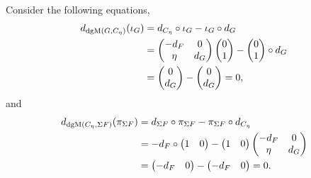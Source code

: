 \begin{remark}
    Consider the following equations,
    \begin{align*}
        d_{\operatorname{dgM}(G, C_{\eta})}(\iota_G) &= d_{C_{\eta}} \circ \iota_G - \iota_G \circ d_G \\
        &=
        \begin{pmatrix}
            -d_F & 0 \\
            \eta & d_G
        \end{pmatrix}
        \begin{pmatrix}
            0 \\
            1
        \end{pmatrix}
        -
        \begin{pmatrix}
            0 \\
            1
        \end{pmatrix}
        \circ d_G \\
        &=
        \begin{pmatrix}
            0 \\
            d_G
        \end{pmatrix}
        -
        \begin{pmatrix}
            0 \\
            d_G
        \end{pmatrix}
        = 0,
    \end{align*}
    and
    \begin{align*}
        d_{\operatorname{dgM}(C_{\eta}, \Sigma F)}(\pi_{\Sigma F}) &= d_{\Sigma F} \circ \pi_{\Sigma F} - \pi_{\Sigma F} \circ d_{C_{\eta}} \\
        &= -d_F \circ
        \begin{pmatrix}
            1 & 0
        \end{pmatrix}
        -
        \begin{pmatrix}
            1 & 0
        \end{pmatrix}
        \begin{pmatrix}
            -d_F & 0 \\
            \eta & d_G
        \end{pmatrix} \\
        &=
        \begin{pmatrix}
            -d_F & 0
        \end{pmatrix}
        -
        \begin{pmatrix}
            -d_F & 0
        \end{pmatrix}
        = 0.
    \end{align*}


\end{remark}
